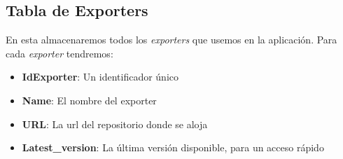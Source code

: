 \subsection*{Tabla de Exporters}
En esta almacenaremos todos los \textit{exporters} que usemos en la aplicación. Para cada \textit{exporter} tendremos:
\begin{itemize}
    \item \textbf{IdExporter}: Un identificador único
    \item \textbf{Name}: El nombre del exporter
    \item \textbf{URL}: La url del repositorio donde se aloja
    \item \textbf{Latest\_version}: La última versión disponible, para un acceso rápido
\end{itemize}
